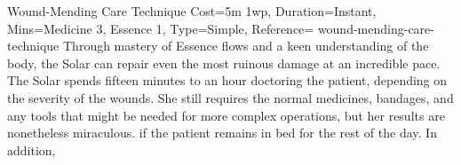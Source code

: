 \begin{Charm}{Wound-Mending Care Technique}{
    Cost=5m 1wp,
    Duration=Instant,
    Mins={Medicine 3, Essence 1},
    Type=Simple,
    Reference=\cite*[p.~342]{ex3}
}{wound-mending-care-technique}
    Through mastery of Essence flows and a keen understanding of the body, the
    Solar can repair even the most ruinous damage at an incredible pace. The
    Solar spends fifteen minutes to an hour doctoring the patient, depending on
    the severity of the wounds. She still requires the normal medicines,
    bandages, and any tools that might be needed for more complex operations,
    but her results are nonetheless miraculous.  if the patient remains in bed for the rest of the day. In
    addition, 
\end{Charm}

\printbibliography[title=References]


